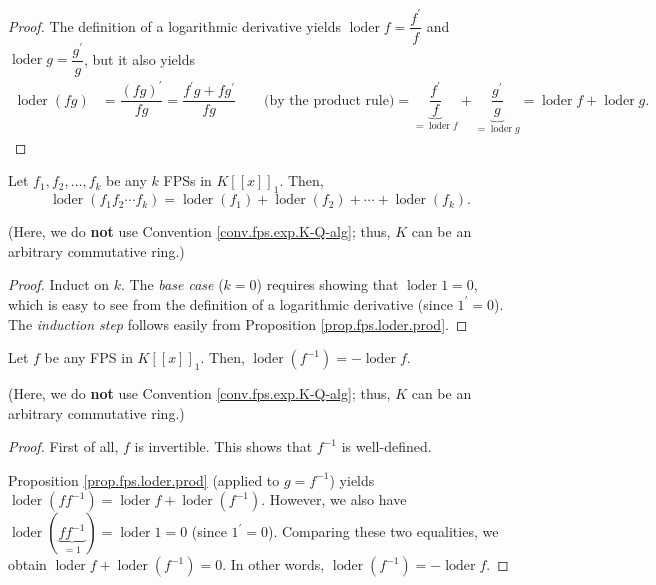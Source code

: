 \begin{proof}
The definition of a
logarithmic derivative yields $\operatorname{loder}f=\dfrac{f^{\prime}}{f}$
and $\operatorname{loder}g=\dfrac{g^{\prime}}{g}$, but it also yields
\begin{align*}
\operatorname{loder}\left(fg\right) &  =\dfrac{\left(fg\right)
^{\prime}}{fg}=\dfrac{f^{\prime}g+fg^{\prime}}{fg}
\qquad\text{(by the product rule)}
=\underbrace{\dfrac{f^{\prime}}{f}}_{=\operatorname{loder}f}
+\underbrace{\dfrac{g^{\prime}}{g}}_{=\operatorname{loder}g}
=\operatorname{loder}f+\operatorname{loder}g.
\end{align*}
\end{proof}

\begin{corollary}
\label{cor.fps.loder.prodk}
\leantarget
\leanok
Let $f_{1},f_{2},\ldots,f_{k}$ be any $k$ FPSs in
$K\left[\left[x\right]\right]_{1}$. Then,
\[
\operatorname{loder}\left(f_{1}f_{2}\cdots f_{k}\right)
=\operatorname{loder}\left(f_{1}\right)+\operatorname{loder}\left(
f_{2}\right)+\cdots+\operatorname{loder}\left(f_{k}\right).
\]

(Here, we do \textbf{not} use Convention \ref{conv.fps.exp.K-Q-alg}; thus, $K$
can be an arbitrary commutative ring.)
\end{corollary}

\begin{proof}
Induct on $k$. The \textit{base
case} ($k=0$) requires showing that $\operatorname{loder}1=0$, which is easy
to see from the definition of a logarithmic derivative (since $1^{\prime}=0$).
The \textit{induction step} follows easily from Proposition
\ref{prop.fps.loder.prod}.
\end{proof}

\begin{corollary}
\label{cor.fps.loder.inv}
\leantarget
\leanok
Let $f$ be any FPS in $K\left[\left[x\right]
\right]_{1}$. Then, $\operatorname{loder}\left(f^{-1}\right)
=-\operatorname{loder}f$.

(Here, we do \textbf{not} use Convention \ref{conv.fps.exp.K-Q-alg}; thus, $K$
can be an arbitrary commutative ring.)
\end{corollary}

\begin{proof}
First of all, $f$ is invertible. This shows that $f^{-1}$
is well-defined.

Proposition \ref{prop.fps.loder.prod} (applied to $g=f^{-1}$) yields
$\operatorname{loder}\left(ff^{-1}\right)=\operatorname{loder}
f+\operatorname{loder}\left(f^{-1}\right)$. However, we also have
$\operatorname{loder}\left(\underbrace{ff^{-1}}_{=1}\right)
=\operatorname{loder}1=0$ (since $1^{\prime}=0$). Comparing these two
equalities, we obtain $\operatorname{loder}f+\operatorname{loder}\left(
f^{-1}\right)=0$. In other words, $\operatorname{loder}\left(
f^{-1}\right)=-\operatorname{loder}f$.
\end{proof}

